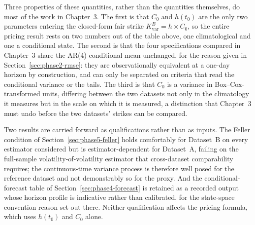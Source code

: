Three properties of these quantities, rather than the quantities themselves, do most of the work in Chapter~3. The first is that $C_0$ and $h(t_0)$ are the only two parameters entering the closed-form fair strike $K_{\text{var}}^B = h \times C_0$, so the entire pricing result rests on two numbers out of the table above, one climatological and one a conditional state. The second is that the four specifications compared in Chapter~3 share the AR(4) conditional mean unchanged, for the reason given in Section~\ref{sec:phase2-rmse}: they are observationally equivalent at a one-day horizon by construction, and can only be separated on criteria that read the conditional variance or the tails. The third is that $C_0$ is a variance in Box--Cox-transformed units, differing between the two datasets not only in the climatology it measures but in the scale on which it is measured, a distinction that Chapter~3 must undo before the two datasets' strikes can be compared.

Two results are carried forward as qualifications rather than as inputs. The Feller condition of Section~\ref{sec:phase5-feller} holds comfortably for Dataset~B on every estimator considered but is estimator-dependent for Dataset~A, failing on the full-sample volatility-of-volatility estimator that cross-dataset comparability requires; the continuous-time variance process is therefore well posed for the reference dataset and not demonstrably so for the proxy. And the conditional-forecast table of Section~\ref{sec:phase4-forecast} is retained as a recorded output whose horizon profile is indicative rather than calibrated, for the state-space convention reason set out there. Neither qualification affects the pricing formula, which uses $h(t_0)$ and $C_0$ alone.

\newpage



